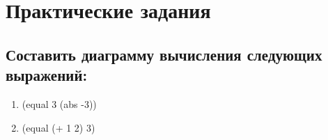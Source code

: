 \chapter{Практические задания}
\section{Составить диаграмму вычисления следующих выражений:}

\begin{enumerate}
	\item (equal 3 (abs -3))
	\begin{figure}[H]
	\end{figure}
	
	\item (equal (+ 1 2) 3)
	\begin{figure}[H]
	\end{figure}


\end{enumerate}
